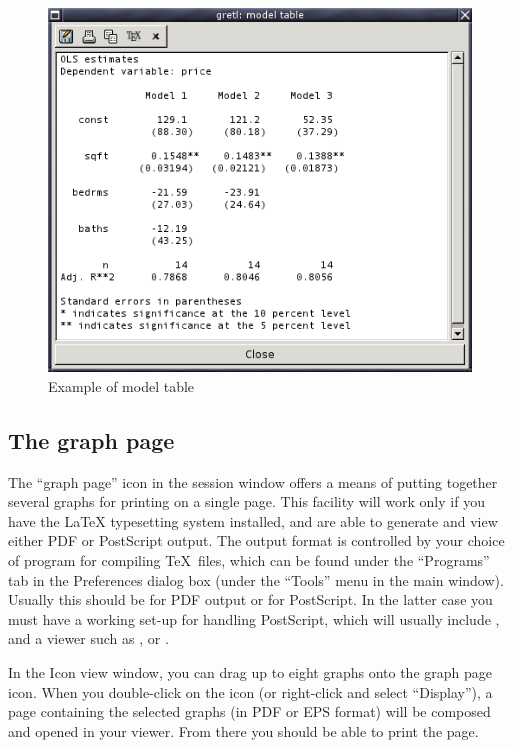 \begin{figure}[htbp]
  \begin{center}
    \includegraphics[scale=0.5]{figures/model_table}
  \end{center}
  \caption{Example of model table}
  \label{fig-model-table}
\end{figure}


\subsection{The graph page}
\label{sect-graphpage}

The ``graph page'' icon in the session window offers a means of
putting together several graphs for printing on a single page.  This
facility will work only if you have the {\LaTeX} typesetting system
installed, and are able to generate and view either PDF or PostScript
output.  The output format is controlled by your choice of program for
compiling \TeX\ files, which can be found under the ``Programs'' tab
in the Preferences dialog box (under the ``Tools'' menu in the main
window).  Usually this should be  for PDF output or
 for PostScript.  In the latter case you must have
a working set-up for handling PostScript, which will
usually include ,  and a viewer such
as ,  or .  

In the Icon view window, you can drag up to eight graphs onto the
graph page icon.  When you double-click on the icon (or right-click
and select ``Display''), a page containing the selected graphs (in PDF
or EPS format) will be composed and opened in your viewer.  From there
you should be able to print the page.

